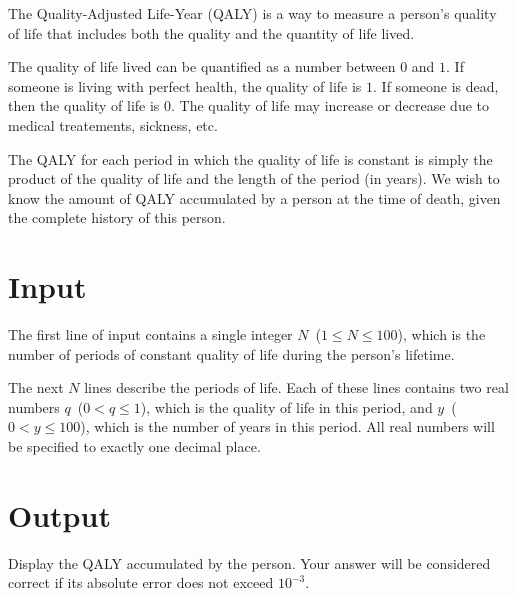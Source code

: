 


The Quality-Adjusted Life-Year (QALY) is a way to measure a person's
quality of life that includes both the quality and the quantity of
life lived.

The quality of life lived can be quantified as a number between $0$ and
$1$.  If someone is living with perfect health, the quality of life is
$1$.  If someone is dead, then the quality of life is $0$.  The quality of
life may increase or decrease due to medical treatements, sickness, 
etc.

The QALY for each period in which the quality of life is constant is
simply the product of the quality of life and the length of the period
(in years).  We wish to know the amount of QALY accumulated by a
person at the time of death, given the complete history of this
person.

\section*{Input}

The first line of input contains a single integer $N$~($1 \leq N \leq 100$), which is the number of periods of constant quality of life during the person's lifetime.

The next $N$ lines describe the periods of life. Each of these lines contains two real numbers $q$~($0 < q \leq 1$), which is the quality of life in this period, and $y$~($0 < y \leq 100$), which is the number of years in this period. All real numbers will be specified to exactly one decimal place.

\section*{Output}

Display the QALY accumulated by the person. Your answer will be considered correct if its absolute error does not exceed $10^{-3}$.
